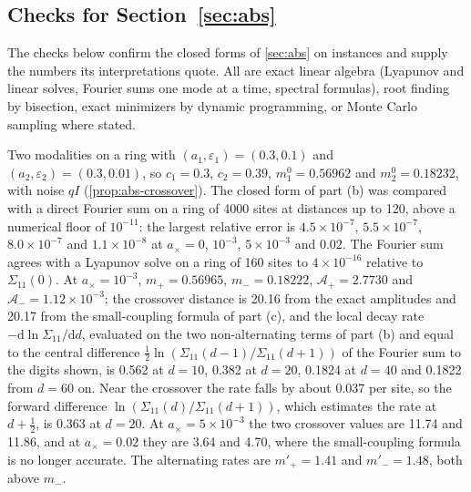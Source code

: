 \subsection{Checks for \texorpdfstring{Section~\ref{sec:abs}}{abstract collectives}}\label{chk:abs}

The checks below confirm the closed forms of \cref{sec:abs} on instances and supply the numbers its interpretations quote. All are exact linear algebra (Lyapunov and linear solves, Fourier sums one mode at a time, spectral formulas), root finding by bisection, exact minimizers by dynamic programming, or Monte Carlo sampling where stated.

\begin{numcheck}\label{chk:abs-crossover}
Two modalities on a ring with $(a_1,\varepsilon_1)=(0.3,0.1)$ and $(a_2,\varepsilon_2)=(0.3,0.01)$, so $c_1=0.3$, $c_2=0.39$, $m^0_1=0.56962$ and $m^0_2=0.18232$, with noise $qI$ (\cref{prop:abs-crossover}). The closed form of part (b) was compared with a direct Fourier sum on a ring of 4000 sites at distances up to 120, above a numerical floor of $10^{-11}$: the largest relative error is $4.5\times10^{-7}$, $5.5\times10^{-7}$, $8.0\times10^{-7}$ and $1.1\times10^{-8}$ at $a_\times=0$, $10^{-3}$, $5\times10^{-3}$ and $0.02$. The Fourier sum agrees with a Lyapunov solve on a ring of 160 sites to $4\times10^{-16}$ relative to $\Sigma_{11}(0)$. At $a_\times=10^{-3}$, $m_+=0.56965$, $m_-=0.18222$, $\mathcal A_+=2.7730$ and $\mathcal A_-=1.12\times10^{-3}$; the crossover distance is 20.16 from the exact amplitudes and 20.17 from the small-coupling formula of part (c), and the local decay rate $-\mathrm d\ln\Sigma_{11}/\mathrm dd$, evaluated on the two non-alternating terms of part (b) and equal to the central difference $\frac12\ln(\Sigma_{11}(d-1)/\Sigma_{11}(d+1))$ of the Fourier sum to the digits shown, is 0.562 at $d=10$, 0.382 at $d=20$, 0.1824 at $d=40$ and 0.1822 from $d=60$ on. Near the crossover the rate falls by about 0.037 per site, so the forward difference $\ln(\Sigma_{11}(d)/\Sigma_{11}(d+1))$, which estimates the rate at $d+\frac12$, is 0.363 at $d=20$. At $a_\times=5\times10^{-3}$ the two crossover values are 11.74 and 11.86, and at $a_\times=0.02$ they are 3.64 and 4.70, where the small-coupling formula is no longer accurate. The alternating rates are $m'_+=1.41$ and $m'_-=1.48$, both above $m_-$.
\end{numcheck}

